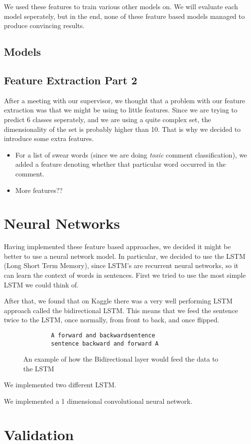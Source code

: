 \documentclass[10pt, a4paper,twocolumn]{article}
\begin{document}
	We used these features to train various other models on. We will evaluate each model seperately, but in the end, none of these feature based models managed to produce convincing results.
		\subsection{Models}
	\subsection{Feature Extraction Part 2}
	
	After a meeting with our supervisor, we thought that a problem with our feature extraction was that we might be using to little features. Since we are trying to predict 6 classes seperately, and we are using a quite complex set, the dimensionality of the set is probably higher than 10. That is why we decided to introduce some extra features.
	
	\begin{itemize}
		\item For a list of swear words (since we are doing \emph{toxic} comment classification), we added a feature denoting whether that particular word occurred in the comment.
		\item {\color{red}More features??} 
	\end{itemize}
	
	
	\section{Neural Networks}
	
	Having implemented these feature based approaches, we decided it might be better to use a neural network model. In particular, we decided to use the LSTM (Long Short Term Memory), since LSTM's are recurrent neural networks, so it can learn the context of words in sentences. First we tried to use the most simple LSTM we could think of.
	
	After that, we found that on Kaggle there was a very well performing LSTM approach called the bidirectional LSTM. This means that we feed the sentence twice to the LSTM, once normally, from front to back, and once flipped.
	\begin{figure}
	\begin{verbatim}	
	    A forward and backwardsentence
	    sentence backward and forward A
	\end{verbatim}
	\caption{An example of how the  Bidirectional layer would feed the data to the LSTM}
	\end{figure}
	
	
	We implemented two different LSTM.
	
	

	We implemented a 1 dimensional convolutional neural network.
	


	
	\section{Validation}
	
	
	
	
\end{document}
